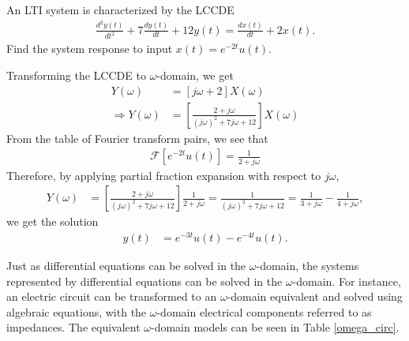 \documentclass{report}
\begin{document}
\begin{example}
    An LTI system is characterized by the LCCDE 
    \begin{align*}
        \frac{d^2y(t)}{dt^2} + 7\frac{dy(t)}{dt} + 12y(t) = \frac{dx(t)}{dt} + 2x(t).
    \end{align*}
    Find the system response to input $x(t)=e^{-2t}u(t)$.
\end{example}
\begin{solution}
    Transforming the LCCDE to $\omega$-domain, we get
    \begin{align*}
        [(j\omega)^2 + 7j\omega + 12]Y(\omega) &= [j\omega + 2]X(\omega) \\
        \Longrightarrow Y(\omega) &= \left[\frac{2+j\omega}{(j\omega)^2 + 7j\omega + 12}\right]X(\omega)
    \end{align*}
    From the table of Fourier transform pairs, we see that 
    \begin{align*}
        \mathcal{F}[e^{-2t}u(t)] = \frac{1}{2+j\omega} 
    \end{align*}
    Therefore, by applying partial fraction expansion with respect to $j\omega$,
    \begin{align*}
        Y(\omega) &= \left[\frac{2+j\omega}{(j\omega)^2 + 7j\omega + 12}\right] \frac{1}{2+j\omega} = \frac{1}{(j\omega)^2 + 7j\omega + 12} = \frac{1}{3+j\omega} - \frac{1}{4+j\omega},
    \end{align*}
    we get the solution
    \begin{align*}
        y(t) &= e^{-3t}u(t) - e^{-4t}u(t).
    \end{align*}
\end{solution}

Just as differential equations can be solved in the $\omega$-domain, the systems represented by differential equations can be solved in the $\omega$-domain. For instance, 
an electric circuit can be transformed to an $\omega$-domain equivalent and solved using algebraic equations, with the $\omega$-domain electrical components referred to  
as impedances. The equivalent $\omega$-domain models can be seen in Table \ref{omega_circ}.
\end{document}
